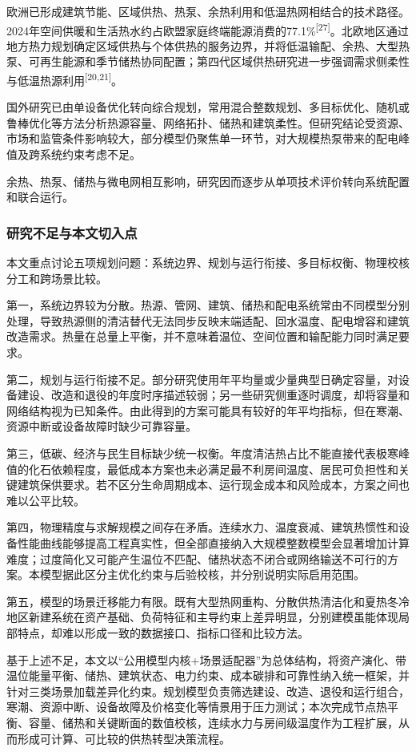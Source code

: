 \documentclass[12pt,a4paper]{article}
\newcommand{\supcite}[1]{\textsuperscript{[#1]}}
\begin{document}
欧洲已形成建筑节能、区域供热、热泵、余热利用和低温热网相结合的技术路径。2024年空间供暖和生活热水约占欧盟家庭终端能源消费的77.1\%\supcite{27}。北欧地区通过地方热力规划确定区域供热与个体供热的服务边界，并将低温输配、余热、大型热泵、可再生能源和季节储热协同配置；第四代区域供热研究进一步强调需求侧柔性与低温热源利用\supcite{20,21}。

国外研究已由单设备优化转向综合规划，常用混合整数规划、多目标优化、随机或鲁棒优化等方法分析热源容量、网络拓扑、储热和建筑柔性。但研究结论受资源、市场和监管条件影响较大，部分模型仍聚焦单一环节，对大规模热泵带来的配电峰值及跨系统约束考虑不足。

余热、热泵、储热与微电网相互影响，研究因而逐步从单项技术评价转向系统配置和联合运行。

\subsubsection{研究不足与本文切入点}

本文重点讨论五项规划问题：系统边界、规划与运行衔接、多目标权衡、物理校核分工和跨场景比较。

第一，系统边界较为分散。热源、管网、建筑、储热和配电系统常由不同模型分别处理，导致热源侧的清洁替代无法同步反映末端适配、回水温度、配电增容和建筑改造需求。热量在总量上平衡，并不意味着温位、空间位置和输配能力同时满足要求。

第二，规划与运行衔接不足。部分研究使用年平均量或少量典型日确定容量，对设备建设、改造和退役的年度时序描述较弱；另一些研究侧重逐时调度，却将容量和网络结构视为已知条件。由此得到的方案可能具有较好的年平均指标，但在寒潮、资源中断或设备故障时缺少可靠容量。

第三，低碳、经济与民生目标缺少统一权衡。年度清洁热占比不能直接代表极寒峰值的化石依赖程度，最低成本方案也未必满足最不利房间温度、居民可负担性和关键建筑保供要求。若不区分生命周期成本、运行现金成本和风险成本，方案之间也难以公平比较。

第四，物理精度与求解规模之间存在矛盾。连续水力、温度衰减、建筑热惯性和设备性能曲线能够提高工程真实性，但全部直接纳入大规模整数模型会显著增加计算难度；过度简化又可能产生温位不匹配、储热状态不闭合或网络输送不可行的方案。本模型据此区分主优化约束与后验校核，并分别说明实际启用范围。

第五，模型的场景迁移能力有限。既有大型热网重构、分散供热清洁化和夏热冬冷地区新建系统在资产基础、负荷特征和主导约束上差异明显，分别建模虽能体现局部特点，却难以形成一致的数据接口、指标口径和比较方法。

基于上述不足，本文以“公用模型内核+场景适配器”为总体结构，将资产演化、带温位能量平衡、储热、建筑状态、电力约束、成本碳排和可靠性纳入统一框架，并针对三类场景加载差异化约束。规划模型负责筛选建设、改造、退役和运行组合，寒潮、资源中断、设备故障及价格变化等情景用于压力测试；本次完成节点热平衡、容量、储热和关键断面的数值校核，连续水力与房间级温度作为工程扩展，从而形成可计算、可比较的供热转型决策流程。
\end{document}
